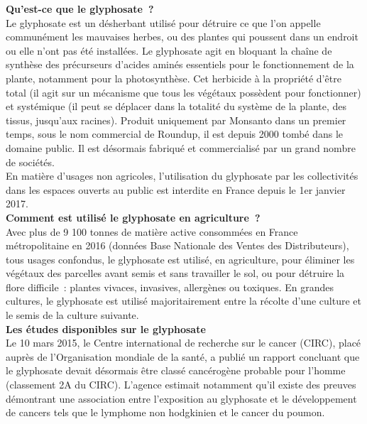 \documentclass[8pt]{article}
\begin{document}
\textbf{Qu'est-ce que le glyphosate~?}\\

Le glyphosate est un désherbant utilisé pour détruire ce que l'on appelle communément les mauvaises herbes, ou des plantes qui poussent dans un endroit ou elle n'ont pas été installées. Le glyphosate agit en bloquant la chaîne de synthèse des précurseurs d’acides aminés essentiels pour le fonctionnement de la plante, notamment pour la photosynthèse.
Cet herbicide à la propriété d’être total (il agit sur un mécanisme que tous les végétaux possèdent pour fonctionner) et systémique (il peut se déplacer dans la totalité du système de la plante, des tissus, jusqu’aux racines).
Produit uniquement par Monsanto dans un premier temps, sous le nom commercial de Roundup, il est depuis 2000 tombé dans le domaine public. Il est désormais fabriqué et commercialisé par un grand nombre de sociétés.\\

En matière d'usages non agricoles, l'utilisation du glyphosate par les collectivités dans les espaces ouverts au public est interdite en France depuis le 1er janvier 2017.\\

\textbf{Comment est utilisé le glyphosate en agriculture~?}\\

Avec plus de 9 100 tonnes de matière active consommées en France métropolitaine en 2016 (données Base Nationale des Ventes des Distributeurs), tous usages confondus, le glyphosate est utilisé, en agriculture, pour éliminer les végétaux des parcelles avant semis et sans travailler le sol, ou pour détruire la flore difficile~: plantes vivaces, invasives, allergènes ou toxiques.
En grandes cultures, le glyphosate est utilisé majoritairement entre la récolte d’une culture et le semis de la culture suivante.\\

\textbf{Les études disponibles sur le glyphosate}\\

Le 10 mars 2015, le Centre international de recherche sur le cancer (CIRC), placé auprès de l’Organisation mondiale de la santé, a publié un rapport concluant que le glyphosate devait désormais être classé cancérogène probable pour l’homme (classement 2A du CIRC). L’agence estimait notamment qu'il existe des preuves démontrant une association entre l'exposition au glyphosate et le développement de cancers tels que le lymphome non hodgkinien et le cancer du poumon.
\end{document}

